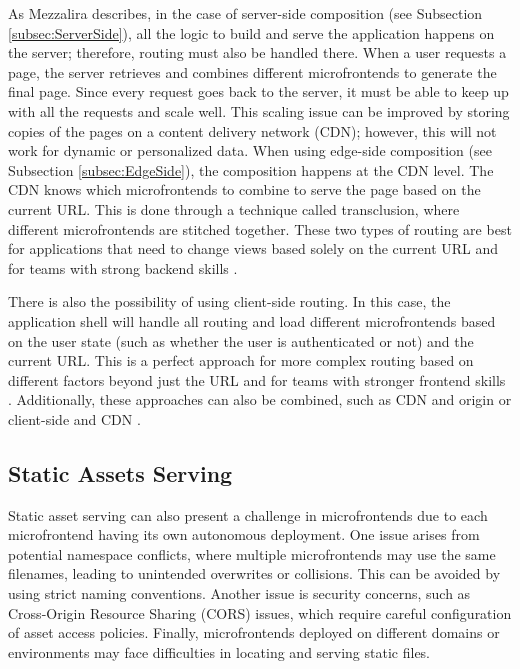 As Mezzalira \cite{MezzaliraBuildingMf} describes, in the case of server-side composition (see Subsection \ref{subsec:ServerSide}), all the logic to build and serve the application happens on the server; therefore, routing must also be handled there. When a user requests a page, the server retrieves and combines different microfrontends to generate the final page. Since every request goes back to the server, it must be able to keep up with all the requests and scale well. This scaling issue can be improved by storing copies of the pages on a content delivery network (CDN); however, this will not work for dynamic or personalized data. When using edge-side composition (see Subsection \ref{subsec:EdgeSide}), the composition happens at the CDN level. The CDN knows which microfrontends to combine to serve the page based on the current URL. This is done through a technique called transclusion, where different microfrontends are stitched together. These two types of routing are best for applications that need to change views based solely on the current URL and for teams with strong backend skills \cite{MezzaliraBuildingMf}.

There is also the possibility of using client-side routing. In this case, the application shell will handle all routing and load different microfrontends based on the user state (such as whether the user is authenticated or not) and the current URL. This is a perfect approach for more complex routing based on different factors beyond just the URL and for teams with stronger frontend skills \cite{MezzaliraBuildingMf}. Additionally, these approaches can also be combined, such as CDN and origin or client-side and CDN \cite{MezzaliraBuildingMf}.

\subsection{Static Assets Serving}
Static asset serving can also present a challenge in microfrontends due to each microfrontend having its own autonomous deployment. One issue arises from potential namespace conflicts, where multiple microfrontends may use the same filenames, leading to unintended overwrites or collisions. This can be avoided by using strict naming conventions. Another issue is security concerns, such as Cross-Origin Resource Sharing (CORS) issues, which require careful configuration of asset access policies. Finally, microfrontends deployed on different domains or environments may face difficulties in locating and serving static files.

